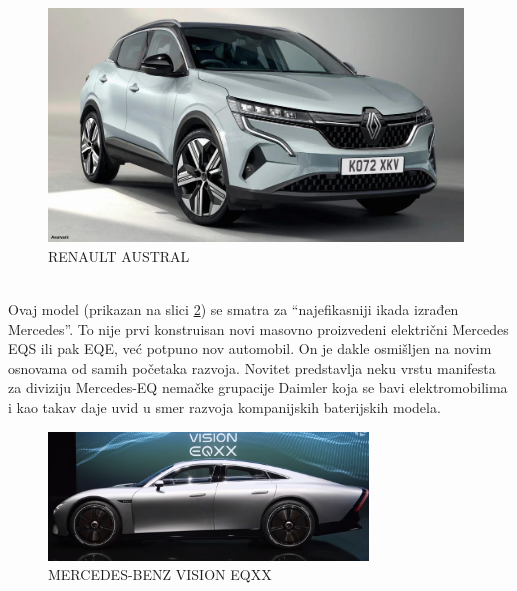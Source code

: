 \documentclass[a4paper]{article}
\begin{document}
\begin{figure}[h]
        \centering
        \includegraphics[width=110mm,scale=0.5]{Austral.jpg}
        \caption{RENAULT AUSTRAL}
        \label{fig:IMG_Austral}
        \end{figure}



\\

    Ovaj model (prikazan na slici \ref{fig:IMG_Mercedes}) se smatra za  “najefikasniji ikada izrađen Mercedes”. To nije prvi konstruisan novi masovno proizvedeni električni Mercedes EQS ili pak EQE, već potpuno nov automobil. On je dakle osmišljen na novim osnovama od samih početaka razvoja. Novitet predstavlja neku vrstu manifesta za diviziju Mercedes-EQ nemačke grupacije Daimler koja se bavi elektromobilima i kao takav daje uvid u smer razvoja kompanijskih baterijskih modela.
 

\begin{figure}[h]
        \centering
        \includegraphics[width=85mm,scale=0.5]{Vision.png}
        \caption{MERCEDES-BENZ VISION EQXX}
        \label{fig:IMG_Mercedes}
        \end{figure}

\\
\end{document}
